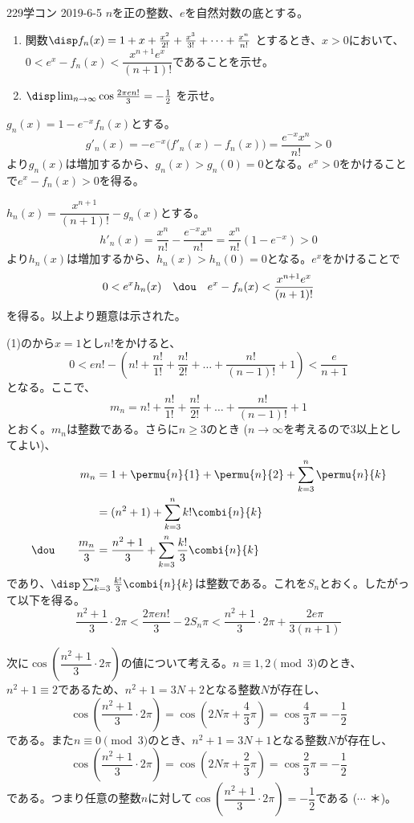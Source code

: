 \begin{prob}{229}{}{学コン 2019-6-5}
 $n$を正の整数、$e$を自然対数の底とする。
 \begin{enumerate}
  \item 関数$\disp f_n(x)=1+x+\frac{x^2}{2!}+\frac{x^3}{3!}+\dots +\frac{x^n}{n!}$ とするとき、$x>0$において、$0<e^x-f_n(x)<\dfrac{x^{n+1}e^x}{(n+1)!}$であることを示せ。
  \item $\disp \lim_{n\to\infty} \cos\frac{2\pi e n!}{3}=-\frac{1}{2}$ を示せ。
 \end{enumerate}
\end{prob}

$g_n(x)=1-e^{-x}f_n(x)$とする。
\[ g'_n(x)=-e^{-x}\bigl(f'_n(x)-f_n(x)\bigr)=\frac{e^{-x}x^n}{n!}>0 \]
より$g_n(x)$は増加するから、$g_n(x)>g_n(0)=0$となる。$e^x>0$をかけることで$e^x-f_n(x)>0$を得る。

$h_n(x)=\dfrac{x^{n+1}}{(n+1)!}-g_n(x)$とする。
\[ h'_n(x)=\frac{x^n}{n!}-\frac{e^{-x}x^n}{n!}=\frac{x^n}{n!}(1-e^{-x})>0 \]
より$h_n(x)$は増加するから、$h_n(x)>h_n(0)=0$となる。$e^x$をかけることで
\[ 0<e^xh_n(x) \quad\dou\quad e^x-f_n(x)<\frac{x^{n+1}e^x}{(n+1)!} \]
を得る。以上より題意は示された。


(1)のから$x=1$とし$n!$をかけると、
\[ 0<en!-\left(n!+\frac{n!}{1!}+\frac{n!}{2!}+\dots +\frac{n!}{(n-1)!}+1\right) < \frac{e}{n+1} \]
となる。ここで、
\[ m_n=n!+\frac{n!}{1!}+\frac{n!}{2!}+\dots +\frac{n!}{(n-1)!}+1 \]
とおく。$m_n$は整数である。さらに$n\ge 3$のとき ($n\to\infty$を考えるので3以上としてよい)、
\begin{align*}
 m_n&= 1+\permu{n}{1}+\permu{n}{2}+\sum_{k=3}^n\permu{n}{k} \\
 &= (n^2+1)+\sum_{k=3}^nk!\combi{n}{k} \\
 \dou\qquad \frac{m_n}{3}&= \frac{n^2+1}{3}+\sum_{k=3}^n\frac{k!}{3}\combi{n}{k}
\end{align*}
であり、$\disp \sum_{k=3}^n\frac{k!}{3}\combi{n}{k}$は整数である。これを$S_n$とおく。したがって以下を得る。
\[ \frac{n^2+1}{3}\cdot 2\pi < \frac{2\pi e n!}{3}-2S_n\pi < \frac{n^2+1}{3}\cdot 2\pi+\frac{2e\pi}{3(n+1)} \]

次に$\cos\left(\dfrac{n^2+1}{3}\cdot 2\pi\right)$の値について考える。$n\equiv 1, 2 \pmod{3}$のとき、$n^2+1\equiv 2$であるため、$n^2+1=3N+2$となる整数$N$が存在し、
\[ \cos\left(\frac{n^2+1}{3}\cdot 2\pi\right)=\cos\left(2N\pi+\frac{4}{3}\pi\right)=\cos\frac{4}{3}\pi=-\frac{1}{2} \]
である。また$n\equiv 0 \pmod{3}$のとき、$n^2+1=3N+1$となる整数$N$が存在し、
\[ \cos\left(\frac{n^2+1}{3}\cdot 2\pi\right)=\cos\left(2N\pi+\frac{2}{3}\pi\right)=\cos\frac{2}{3}\pi=-\frac{1}{2} \]
である。つまり任意の整数$n$に対して$\cos\left(\dfrac{n^2+1}{3}\cdot 2\pi\right)=-\dfrac{1}{2}$である ($\cdots$ ＊)。

